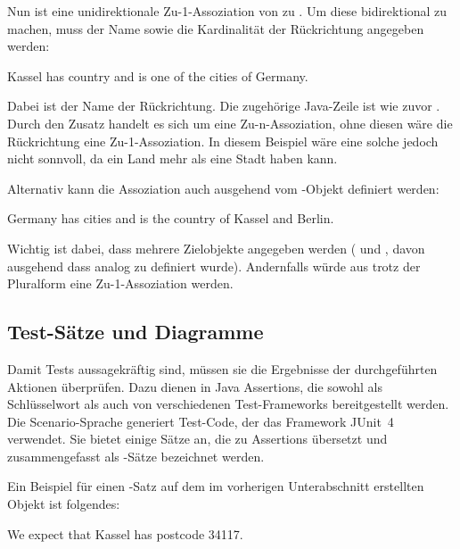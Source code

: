 Nun ist  eine unidirektionale Zu-1-Assoziation von  zu .
Um diese bidirektional zu machen, muss der Name sowie die Kardinalität der Rückrichtung angegeben werden:

\begin{codeblock}
    Kassel has country and is one of the cities of Germany.
\end{codeblock}

Dabei ist  der Name der Rückrichtung.
Die zugehörige Java-Zeile ist wie zuvor .
Durch den Zusatz  handelt es sich um eine Zu-n-Assoziation, ohne diesen wäre die Rückrichtung eine Zu-1-Assoziation.
In diesem Beispiel wäre eine solche jedoch nicht sonnvoll, da ein Land mehr als eine Stadt haben kann.

Alternativ kann die Assoziation auch ausgehend vom -Objekt definiert werden:

\begin{codeblock}
    Germany has cities and is the country of Kassel and Berlin.
\end{codeblock}

Wichtig ist dabei, dass mehrere Zielobjekte angegeben werden ( und , davon ausgehend dass  analog zu  definiert wurde).
Andernfalls würde aus  trotz der Pluralform eine Zu-1-Assoziation werden.

\subsection{Test-Sätze und Diagramme}\label{subsec:test-sentences-and-diagrams}

Damit Tests aussagekräftig sind, müssen sie die Ergebnisse der durchgeführten Aktionen überprüfen.
Dazu dienen in Java Assertions, die sowohl als Schlüsselwort als auch von verschiedenen Test-Frameworks bereitgestellt werden.
Die Scenario-Sprache generiert Test-Code, der das Framework JUnit~4~\cite{junit4} verwendet.
Sie bietet einige Sätze an, die zu Assertions übersetzt und zusammengefasst als -Sätze bezeichnet werden.

Ein Beispiel für einen -Satz auf dem im vorherigen Unterabschnitt erstellten Objekt  ist folgendes:

\begin{codeblock}
    We expect that Kassel has postcode 34117.
\end{codeblock}


